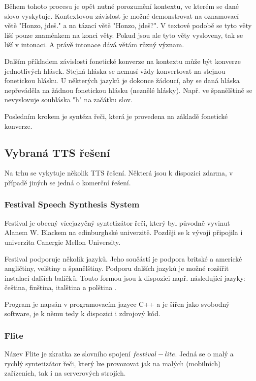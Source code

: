 \documentclass[ing,male,java,dept460,twoside]{diploma}						%
\begin{document}
Během tohoto procesu je opět nutné porozumění kontextu, ve kterém se dané slovo vyskytuje. Kontextovou závislost je možné demonstrovat na oznamovací větě "Honzo, jdeš." a na tázací větě "Honzo, jdeš?". V textové podobě se tyto věty liší pouze znaménkem na konci věty. Pokud jsou ale tyto věty vysloveny, tak se liší v intonaci. A právě intonace dává větám různý význam.

Dalším příkladem závislosti fonetické konverze na kontextu může být konverze jednotlivých hlásek. Stejná hláska se nemusí vždy konvertovat na stejnou fonetickou hlásku. U některých jazyků je dokonce žádoucí, aby se daná hláska nepřeváděla na žádnou fonetickou hlásku (neznělé hlásky). Např. ve španělštině se nevyslovuje souhláska "h" na začátku slov.

Posledním krokem je syntéza řeči, která je provedena na základě fonetické konverze.

\subsection{Vybraná TTS řešení}
Na trhu se vykytuje několik TTS řešení. Některá jsou k dispozici zdarma, v případě jiných se jedná o komerční řešení.

\subsubsection{Festival Speech Synthesis System}
Festival je obecný vícejazyčný syntetizátor řeči, který byl původně vyvinut Alanem W. Blackem na edinburghské univerzitě. Později se k vývoji připojila i univerzita Canergie Mellon University.

Festival podporuje několik jazyků. Jeho součástí je podpora britské a americké angličtiny, velštiny a španělštiny. Podporu dalších jazyků je možné rozšířit instalací dalších balíčků. Touto formou jsou k dispozici např. následující jazyky: čeština, finština, italština a polština \cite{festival_wiki}.

Program je napsán v programovacím jazyce C++ a je šířen jako svobodný software, je k němu tedy k dispozici i zdrojový kód.

\subsubsection{Flite}
\label{sec:flite}
Název Flite je zkratka ze slovního spojení $festival-lite$. Jedná se o malý a rychlý syntetizátor řeči, který lze provozovat jak na malých (mobilních) zařízeních, tak i na serverových strojích.
\end{document}
